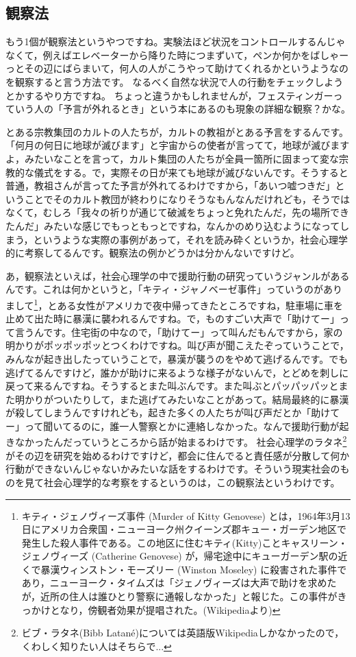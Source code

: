 \documentclass{ltjsbook}
\begin{document}
\subsection{観察法}
もう1個が観察法というやつですね。実験法ほど状況をコントロールするんじゃなくて，例えばエレベーターから降りた時につまずいて，ペンか何かをばしゃーっとその辺にばらまいて，何人の人がこうやって助けてくれるかというようなのを観察すると言う方法です。
なるべく自然な状況で人の行動をチェックしようとかするやり方ですね。
ちょっと違うかもしれませんが，フェスティンガーっていう人の「予言が外れるとき」という本にあるのも現象の詳細な観察？かな。

とある宗教集団のカルトの人たちが，カルトの教祖がとある予言をするんです。「何月の何日に地球が滅びます」と宇宙からの使者が言ってて，地球が滅びますよ，みたいなことを言って，カルト集団の人たちが全員一箇所に固まって変な宗教的な儀式をする。で，実際その日が来ても地球が滅びないんです。そうすると普通，教祖さんが言ってた予言が外れてるわけですから，「あいつ嘘つきだ」ということでそのカルト教団が終わりになりそうなもんなんだけれども，そうではなくて，むしろ「我々の祈りが通じて破滅をちょっと免れたんだ，先の場所できたんだ」みたいな感じでもっともっとですね，なんかのめり込むようになってしまう，というような実際の事例があって，それを読み砕くというか，社会心理学的に考察してるんです。観察法の例かどうかは分かんないですけど。

あ，観察法といえば，社会心理学の中で援助行動の研究っていうジャンルがあるんです。これは何かというと，「キティ・ジャノベーゼ事件」っていうのがありまして\footnote{キティ・ジェノヴィーズ事件 (Murder of Kitty Genovese) とは，1964年3月13日にアメリカ合衆国・ニューヨーク州クイーンズ郡キュー・ガーデン地区で発生した殺人事件である。この地区に住むキティ(Kitty)ことキャスリーン・ジェノヴィーズ (Catherine Genovese) が，帰宅途中にキューガーデン駅の近くで暴漢ウィンストン・モーズリー (Winston Moseley) に殺害された事件であり，ニューヨーク・タイムズは「ジェノヴィーズは大声で助けを求めたが，近所の住人は誰ひとり警察に通報しなかった」と報じた。この事件がきっかけとなり，傍観者効果が提唱された。(Wikipediaより)}，とある女性がアメリカで夜中帰ってきたところですね，駐車場に車を止めて出た時に暴漢に襲われるんですね。で，ものすごい大声で「助けてー」って言うんです。住宅街の中なので，「助けてー」って叫んだもんですから，家の明かりがポッポッポッとつくわけですね。叫び声が聞こえたぞっていうことで，みんなが起き出したっていうことで，暴漢が襲うのをやめて逃げるんです。でも逃げてるんですけど，誰かが助けに来るような様子がないんで，とどめを刺しに戻って来るんですね。そうするとまた叫ぶんです。また叫ぶとパッパッパッとまた明かりがついたりして，また逃げてみたいなことがあって。結局最終的に暴漢が殺してしまうんですけれども，起きた多くの人たちが叫び声だとか「助けてー」って聞いてるのに，誰一人警察とかに連絡しなかった。なんで援助行動が起きなかったんだっていうところから話が始まるわけです。
社会心理学のラタネ\footnote{ビブ・ラタネ(Bibb Latan\'e)については英語版Wikipediaしかなかったので，くわしく知りたい人はそちらで...}がその辺を研究を始めるわけですけど，都会に住んでると責任感が分散して何か行動ができないんじゃないかみたいな話をするわけです。そういう現実社会のものを見て社会心理学的な考察をするというのは，この観察法というわけです。
\end{document}
